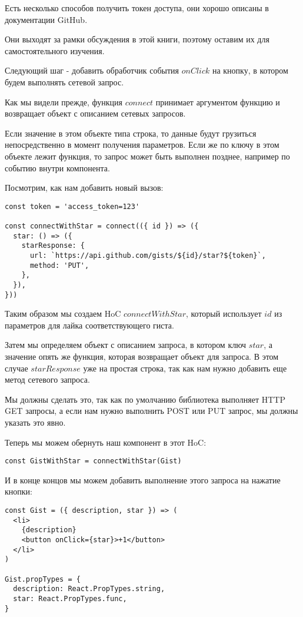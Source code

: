 Есть несколько способов получить токен доступа, они хорошо описаны в документации GitHub.

Они выходят за рамки обсуждения в этой книги, поэтому оставим их для самостоятельного изучения.

Следующий шаг - добавить обработчик события $onClick$ на кнопку, в котором будем выполнять сетевой запрос.

Как мы видели прежде, функция $connect$ принимает аргументом функцию и возвращает объект с описанием сетевых запросов.

Если значение в этом объекте типа строка, то данные будут грузиться непосредственно в момент получения параметров. Если же по ключу в этом объекте лежит функция, то запрос может быть выполнен позднее, например по событию внутри компонента.

Посмотрим, как нам добавить новый вызов:

\begin{lstlisting}
const token = 'access_token=123'

const connectWithStar = connect(({ id }) => ({
  star: () => ({
    starResponse: {
      url: `https://api.github.com/gists/${id}/star?${token}`,
      method: 'PUT',
    }, 
  }),
}))
\end{lstlisting}

Таким образом мы создаем HoC $connectWithStar$, который использует $id$ из параметров для лайка соответствующего гиста.

Затем мы определяем объект с описанием запроса, в котором ключ $star$, а значение опять же функция, которая возвращает объект для запроса. В этом случае $starResponse$ уже на простая строка, так как нам нужно добавить еще метод сетевого запроса.

Мы должны сделать это, так как по умолчанию библиотека выполняет HTTP GET запросы, а если нам нужно выполнить POST или PUT запрос, мы должны указать это явно.

Теперь мы можем обернуть наш компонент в этот HoC:

\begin{lstlisting}
const GistWithStar = connectWithStar(Gist)
\end{lstlisting}

И в конце концов мы можем добавить выполнение этого запроса на нажатие кнопки:

\begin{lstlisting}
const Gist = ({ description, star }) => (
  <li>
    {description}
    <button onClick={star}>+1</button>
  </li>
)

Gist.propTypes = {
  description: React.PropTypes.string,
  star: React.PropTypes.func,
}
\end{lstlisting}

